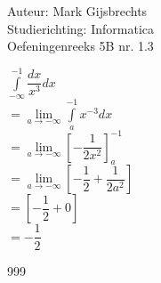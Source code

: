 \documentclass[a4paper]{article}
\newcommand{\dint}{\displaystyle\int}
\begin{document}
\noindent \large Auteur: Mark Gijsbrechts \\
\noindent \large Studierichting: Informatica\\
\noindent \large Oefeningenreeks 5B nr. 1.3\\

\medskip

\normalsize





$ \dint\limits_{-\infty}^{-1} \dfrac{dx}{x^3} dx  $ \\

$= \lim\limits_{a \to -\infty} \dint\limits_{a}^{-1} x^{-3} dx  $ \\

$= \lim\limits_{a \to -\infty} \left[ -\dfrac{1}{2x^2} \right]_{a}^{-1}  $ \\

$= \lim\limits_{a \to -\infty} \left[ -\dfrac{1}{2} + \dfrac{1}{2a^2} \right] $ \\

$= \left[ -\dfrac{1}{2} + 0 \right] $ \\

$= -\dfrac{1}{2} $ \\




\begin{thebibliography}{999}
\end{thebibliography}
\end{document}
